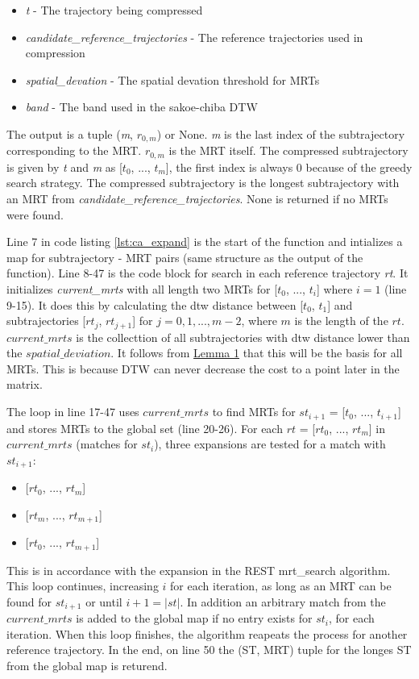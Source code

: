 

\begin{itemize}
    \item{\textit{t} - The trajectory being compressed}
    \item{\textit{candidate\_reference\_trajectories} - The reference trajectories used in compression}
    \item{\textit{spatial\_devation} - The spatial devation threshold for MRTs}
    \item{\textit{band} - The band used in the sakoe-chiba DTW}
\end{itemize}

The output is a tuple (\textit{m}, $r_{0,m}$) or None. \textit{m} is the last index of the subtrajectory corresponding to the MRT. $r_{0,m}$ is the MRT itself. The compressed subtrajectory is given by \textit{t} and \textit{m} as [$t_0$, ..., $t_m$], the first index is always 0 because of the greedy search strategy. The compressed subtrajectory is the longest subtrajectory with an MRT from \textit{candidate\_reference\_trajectories}. None is returned if no MRTs were found.

Line 7 in code listing \ref{lst:ca_expand} is the start of the function and intializes a map for subtrajectory - MRT pairs (same structure as the output of the function). Line 8-47 is the code block for search in each reference trajectory \textit{rt}. It initializes \textit{current\_mrts} with all length two MRTs for [$t_0$, ..., $t_i$] where $i = 1$ (line 9-15). It does this by calculating the dtw distance between [$t_0$, $t_1$] and subtrajectories [$rt_j$, $rt_{j+1}$] for $j = 0, 1, ..., m-2$, where $m$ is the length of the $rt$. $current\_mrts$ is the collecttion of all subtrajectories with dtw distance lower than the $spatial\_deviation$. It follows from \hyperref[lemma]{Lemma 1} that this will be the basis for all MRTs. This is because DTW can never decrease the cost to a point later in the matrix.

The loop in line 17-47 uses $current\_mrts$ to find MRTs for $st_{i+1}$ = [$t_0$, ..., $t_{i+1}$] and stores MRTs to the global set (line 20-26). For each $rt$ = [$rt_0$, ..., $rt_m$] in $current\_mrts$ (matches for $st_i$), three expansions are tested for a match with $st_{i+1}$:
\begin{itemize}
    \item {[$rt_0$, ..., $rt_m$]}
    \item {[$rt_m$, ..., $rt_{m+1}$]}
    \item {[$rt_0$, ..., $rt_{m+1}$]}
\end{itemize}
This is in accordance with the expansion in the REST mrt\_search algorithm. This loop continues, increasing $i$ for each iteration, as long as an MRT can be found for $st_{i+1}$ or until $i+1 = |st|$. In addition an arbitrary match from the $current\_mrts$ is added to the global map if no entry exists for $st_{i}$, for each iteration. When this loop finishes, the algorithm reapeats the process for another reference trajectory. In the end, on line 50 the (ST, MRT) tuple for the longes ST from the global map is returend.

